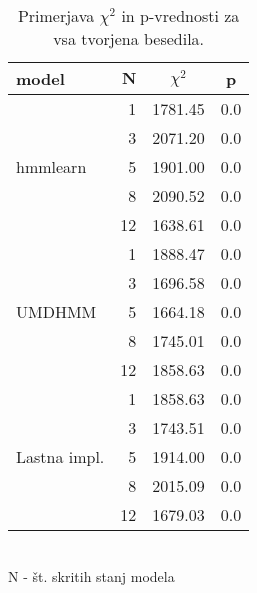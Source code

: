 \begin{table}
\centering
\begin{tabular}{|l|r|c|c|}
\hline
{\bf model}  & $\mathbf{N}$ & {\bf $\chi^2$} & \bf{p} \\
  \hline\multirow{5}{*}{hmmlearn} %
    &  1              & 1781.45        & 0.0 \\
    &  3              & 2071.20        & 0.0 \\
    &  5              & 1901.00        & 0.0 \\
    &  8              & 2090.52        & 0.0 \\
    & 12              & 1638.61        & 0.0 \\
  \hline\multirow{5}{*}{UMDHMM} %
    &  1              & 1888.47        & 0.0 \\
    &  3              & 1696.58        & 0.0 \\
    &  5              & 1664.18        & 0.0 \\
    &  8              & 1745.01        & 0.0 \\
    & 12              & 1858.63        & 0.0 \\
  \hline\multirow{5}{*}{Lastna impl.} %
    &  1              & 1858.63        & 0.0 \\
    &  3              & 1743.51        & 0.0 \\
    &  5              & 1914.00        & 0.0 \\
    &  8              & 2015.09        & 0.0 \\
    & 12              & 1679.03        & 0.0 \\
\hline
\end{tabular}
\\ {\centering N - št. skritih stanj modela}
\caption{Primerjava $\chi^2$ in p-vrednosti za vsa tvorjena besedila.}
\label{tab:bench:models_vs_corpus}
\end{table}
